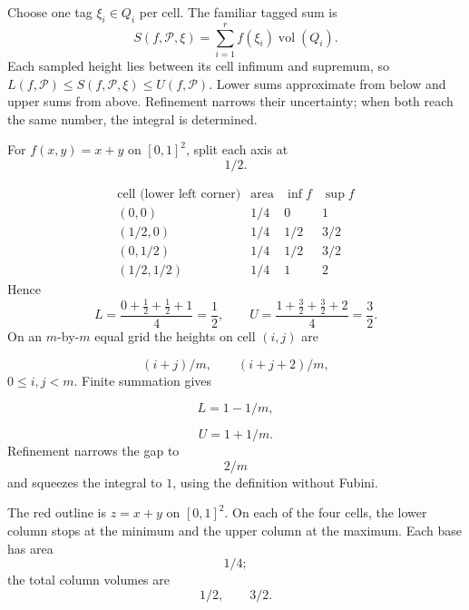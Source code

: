 Choose one tag $\xi_i\in Q_i$ per cell. The familiar tagged sum is
\[
S(f,\mathcal P,\xi)=\sum_{i=1}^r f(\xi_i)\operatorname{vol}(Q_i).
\]
Each sampled height lies between its cell infimum and supremum, so
$L(f,\mathcal P)\leq S(f,\mathcal P,\xi)\leq U(f,\mathcal P)$.
Lower sums approximate from below and upper sums from above. Refinement
narrows their uncertainty; when both reach the same number, the integral
is determined.
\begin{example}
For $f(x,y)=x+y$ on $[0,1]^2$, split each axis at
\[
1/2.
\]

\[
\begin{array}{c|c|c|c}
\text{cell (lower left corner)}&\text{area}&\inf f&\sup f\\\hline
(0,0)&1/4&0&1\\
(1/2,0)&1/4&1/2&3/2\\
(0,1/2)&1/4&1/2&3/2\\
(1/2,1/2)&1/4&1&2
\end{array}
\]
Hence
\[
L=\frac{0+\frac12+\frac12+1}{4}=\frac12,
\qquad
U=\frac{1+\frac32+\frac32+2}{4}=\frac32.
\]
On an $m$-by-$m$ equal grid the heights on cell $(i,j)$ are

\[
(i+j)/m,\qquad (i+j+2)/m,
\]
 $0\leq i,j<m$. Finite summation gives

\[
L=1-1/m,
\]

\[
U=1+1/m.
\]
 Refinement narrows the gap to
\[
2/m
\]
 and squeezes
the integral to $1$, using the definition without Fubini.
\end{example}
\begin{center}
\end{center}
The red outline is $z=x+y$ on $[0,1]^2$. On each of the four cells,
the lower column stops at the minimum and the upper column at the maximum.
Each base has area
\[
1/4;
\]
 the total column volumes are
\[
1/2,\qquad 3/2.
\]



